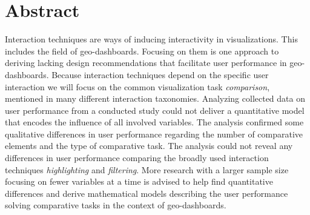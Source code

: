 \chapter*{Abstract}
Interaction techniques are ways of inducing interactivity in visualizations. This includes the field of geo-dashboards.
Focusing on them is one approach to deriving lacking design recommendations that facilitate user performance in geo-dashboards.
Because interaction techniques depend on the specific user interaction we will focus on the common
visualization task \textit{comparison}, mentioned in many different interaction taxonomies. Analyzing collected data on user
performance from a conducted study could not deliver a quantitative model that encodes the influence of all involved variables.
The analysis confirmed some qualitative differences in user performance regarding the number of comparative elements and the type
of comparative task. The analysis could not reveal any differences in user performance comparing the broadly used interaction techniques
\textit{highlighting} and \textit{filtering}. More research with a larger sample size focusing on fewer variables at a time is
advised to help find quantitative differences and derive mathematical models describing the user performance solving comparative
tasks in the context of geo-dashboards.